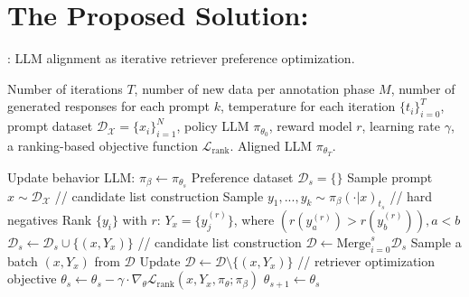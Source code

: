 \section{The Proposed Solution: \Ours}\label{sec:proposal1}

\begin{algorithm}[t]
\caption{\Ours: LLM alignment as iterative retriever preference optimization.}\label{alg-ours}
\begin{algorithmic}[1]
\REQUIRE Number of iterations $T$, number of new data per annotation phase $M$, number of generated responses for each prompt $k$, temperature for each iteration $\{t_i\}^T_{i=0}$, prompt dataset $\mathcal{D}_\mathcal{X} = \{x_i\}_{i=1}^N$, policy LLM $\pi_{\theta_0}$, reward model $r$, learning rate $\gamma$, a ranking-based objective function $\mathcal{L}_{\text{rank}}$.
\ENSURE Aligned LLM $\pi_{\theta_T}$.

        \STATE Update behavior LLM: $\pi_\beta \leftarrow \pi_{\theta_s}$
        \STATE Preference dataset $\mathcal{D}_s = \{\}$
            \STATE Sample prompt $x \sim \mathcal{D}_\mathcal{X}$
            \STATE // \textcolor{myblue}{candidate list construction}
            \STATE Sample $y_1, ..., y_k \sim \pi_{\beta}(\cdot|x)_{t_s}$  
            \STATE // \textcolor{myblue}{hard negatives}
            \STATE Rank $\{y_i\}$ with $r$: $Y_x= \{ y^{(r)}_j \}$, where $(r(y^{(r)}_a) > r(y^{(r)}_b)), a<b$ 
            \STATE $\mathcal{D}_s \leftarrow \mathcal{D}_s \cup \{(x, Y_x)\}$
        \ENDFOR
    \STATE // \textcolor{myblue}{candidate list construction}
    \STATE $\mathcal{D} \leftarrow  \text{Merge}^s_{i=0} \mathcal{D}_s$ 
    \STATE Sample a batch $(x, Y_x)$ from $\mathcal{D}$
    \STATE Update $\mathcal{D} \leftarrow \mathcal{D} \setminus \{(x, Y_x)\}$
    \STATE // \textcolor{myblue}{retriever optimization objective}
    \STATE $\theta_{s} \leftarrow \theta_s - \gamma \cdot \nabla_\theta \mathcal{L}_{\text{rank}}(x, Y_x, \pi_\theta; \pi_\beta)$
    \ENDWHILE
    \STATE $\theta_{s+1} \leftarrow \theta_s$
\ENDFOR
\end{algorithmic}
\end{algorithm}

